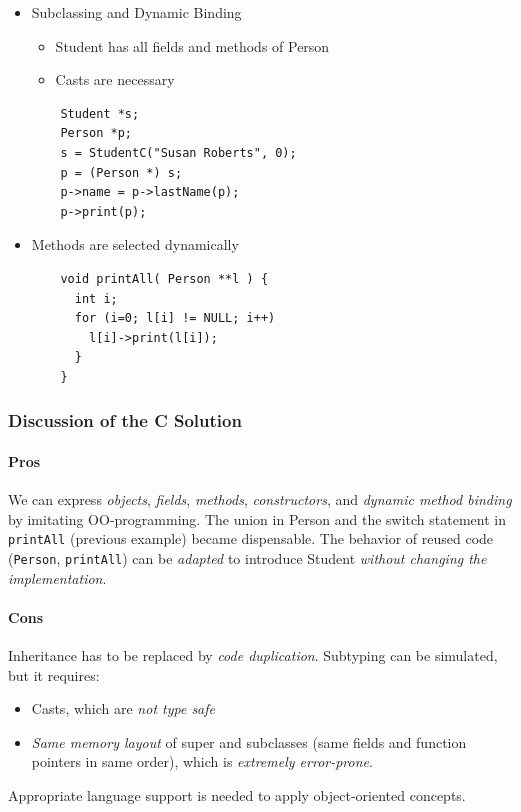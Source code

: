 \begin{itemize}
\begin{lstlisting}
    printf("Name: %s\n", this->name);
    printf("No: %d\n", this->regNum);
  }
  Student *StudentC(String n, int r) {
    Student *this  = (Student *) malloc(sizeof(Student));
    this->name     = n
    this->print    = printStudent;
    this->lastName = (String (*)(Student*)) LN_Person;
    this->regNum   = r;
    return this;
  }
 \end{lstlisting}
 \item Subclassing and Dynamic Binding
  \begin{itemize}
   \item Student has all fields and methods of Person
   \item Casts are necessary
  \end{itemize}
  \begin{lstlisting}
    Student *s;
    Person *p;
    s = StudentC("Susan Roberts", 0);
    p = (Person *) s;
    p->name = p->lastName(p);
    p->print(p);
  \end{lstlisting}
  \item Methods are selected dynamically
  \begin{lstlisting}
    void printAll( Person **l ) {
      int i;
      for (i=0; l[i] != NULL; i++)
        l[i]->print(l[i]);
      }
    }
  \end{lstlisting}
\end{itemize}

\subsubsection{Discussion of the C Solution}

\paragraph{Pros} We can express \emph{objects}, \emph{fields}, \emph{methods}, \emph{constructors}, and \emph{dynamic method binding} by imitating OO-programming. The union in Person and the switch statement in \lstinline{printAll} (previous example) became dispensable.
The behavior of reused code (\lstinline{Person}, \lstinline{printAll}) can be \emph{adapted} to introduce Student \emph{without changing the implementation}.
\paragraph{Cons} Inheritance has to be replaced by \emph{code duplication}. Subtyping can be simulated, but it requires:
\begin{itemize}
 \item Casts, which are \emph{not type safe}
 \item \emph{Same memory layout} of super and subclasses (same fields and function pointers in same order), which is \emph{extremely error-prone}.
\end{itemize}
Appropriate language support is needed to apply object-oriented concepts.


